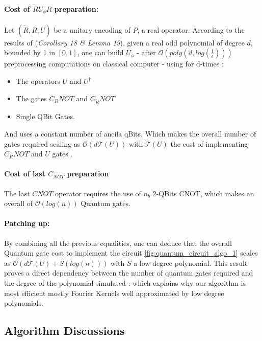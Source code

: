 \documentclass{article}
\begin{document}
\paragraph{Cost of $\widetilde{R}U_\phi R$ preparation:}
Let $(\widetilde{R}, R, U)$ be a unitary encoding of $P$, a real operator. According to the results of \cite{gilyén_su_low_wiebe_2019} (\textit{Corollary 18 
\& Lemma 19}), given a real odd polynomial of degree $d$, bounded by 1 in $[0,1]$, one can build $U_\phi$ - after $\mathcal{O}(poly(d, log(\frac{1}{\epsilon})))$ preprocessing computations on classical computer - using for d-times : 
\begin{itemize}
    \item The operators $U$ and $U^\dagger$
    \item The gates $C_R NOT$ and $C_{\widetilde{R}} NOT$
    \item Single QBit Gates.
\end{itemize}
And uses a constant number of ancila qBits. Which makes the overall number of gates required scaling as $\mathcal{O}(d \mathcal{T}(U))$ with $\mathcal{T}(U)$ the cost of implementing $C_R NOT$ and $U$ gates \cite{gilyén_su_low_wiebe_2019}.

\paragraph{Cost of last $C_{NOT}$ preparation}

The last $CNOT$ operator requires the use of $n_b$ 2-QBits CNOT, which makes an overall of $\mathcal{O}(log(n))$ Quantum gates.

\paragraph{Patching up:}
By combining all the previous equalities, one can deduce that the overall Quantum gate cost to implement the circuit \ref{fig:quantum_circuit_algo_1} scales as $\mathcal{O}(d \mathcal{T}(U) + S(log(n)))$ with $S$ a low degree polynomial. This result proves a direct dependency between the number of quantum gates required and the degree of the polynomial simulated : which explains why our algorithm is most efficient mostly Fourier Kernels well approximated by low degree polynomials.

\subsection{Algorithm Discussions}\label{subsubsec:algo_1_extensions}
\end{document}
